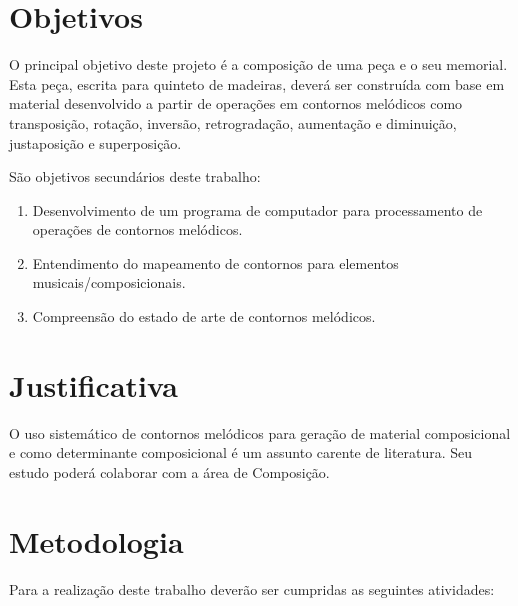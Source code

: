 \documentclass{article}
\begin{document}
\section{Objetivos}
\label{sec:objetivos}

O principal objetivo deste projeto é a composição de uma peça e o seu
memorial.  Esta peça, escrita para quinteto de madeiras, deverá ser
construída com base em material desenvolvido a partir de operações em
contornos melódicos como transposição, rotação, inversão,
retrogradação, aumentação e diminuição, justaposição e superposição.

São objetivos secundários deste trabalho:

\begin{enumerate}
\item Desenvolvimento de um programa de computador para processamento
  de operações de contornos melódicos.
\item Entendimento do mapeamento de contornos para elementos
  musicais/composicionais.
\item Compreensão do estado de arte de contornos melódicos.
\end{enumerate}

\section{Justificativa}
\label{sec:justificativa}

O uso sistemático de contornos melódicos para geração de material
composicional e como determinante composicional é um assunto carente
de literatura. Seu estudo poderá colaborar com a área de Composição.

\section{Metodologia}
\label{sec:metodologia}

Para a realização deste trabalho deverão ser cumpridas as seguintes
atividades:
\end{document}
